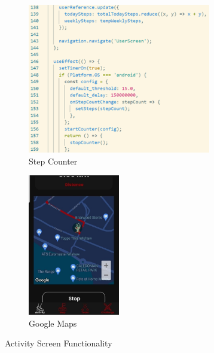 \documentclass{l4proj}
\begin{document}
\begin{figure}
\centering
\begin{subfigure}{.50\textwidth}
  \centering
  \includegraphics[width=80mm]{dissertation/images/13.png}
  \caption{Step Counter}
  \label{fig:sub1}
\end{subfigure}%
\begin{subfigure}{.5\textwidth}
  \centering
  \includegraphics[width=40mm]{dissertation/images/14.jpg}
  \caption{Google Maps}
  \label{fig:sub2}
\end{subfigure}
\caption{Activity Screen Functionality}
\label{fig:test}
\end{figure}
\end{document}
